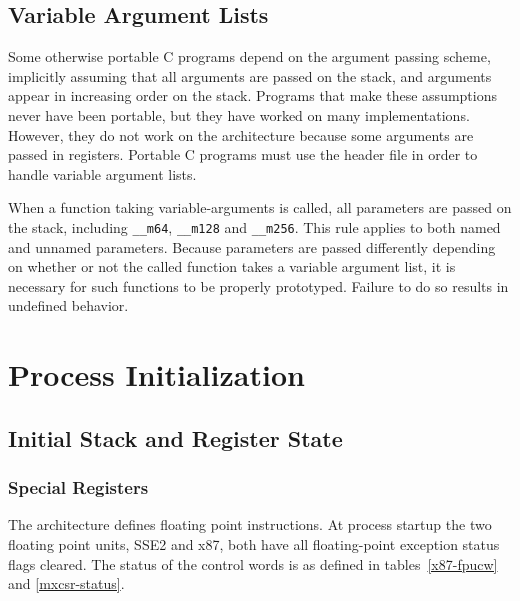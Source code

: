 \subsection{Variable Argument Lists}

Some otherwise portable C programs depend on the argument passing
scheme, implicitly assuming that all arguments are passed on the
stack, and arguments appear in increasing order on the stack.
Programs that make these assumptions never have been portable, but
they have worked on many implementations. However, they do not work on
the \xARCH architecture because some arguments are passed in
registers.  Portable C programs must use the header file
 in order to handle variable argument lists.

When a function taking variable-arguments is called, all parameters are
passed on the stack, including \texttt{__m64}, \texttt{__m128} and
\texttt{__m256}.  This rule applies to both named and unnamed parameters.
Because parameters are passed differently depending on whether or not the
called function takes a variable argument list, it is necessary for such
functions to be properly prototyped.  Failure to do so results in
undefined behavior.

\section{Process Initialization}

\subsection{Initial Stack and Register State}

\subsubsection{Special Registers}

The \xARCH architecture defines floating point instructions.  At
process startup the two floating point units, SSE2 and x87, both have
all floating-point exception status flags cleared.  The status of the
control words is as defined in tables~\ref{x87-fpucw} and
\ref{mxcsr-status}.

